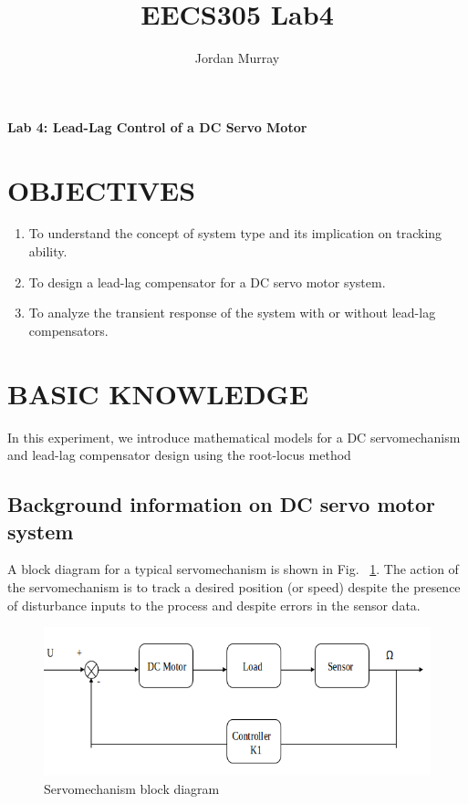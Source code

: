 \documentclass[11pt,a4paper]{article}
\author{Jordan Murray}
\title{EECS305 Lab4}
\begin{document}
\begin{center}
\fontsize{24}{12}\selectfont
\textbf{Lab 4: Lead-Lag Control of a DC Servo Motor}
\end{center}
\section{OBJECTIVES}
\begin{enumerate}
\item To understand the concept of system type and its implication on tracking ability.

\item To design a lead-lag compensator for a DC servo motor system.

\item To analyze the transient response of the system with or without lead-lag compensators.
\end{enumerate}

\section{BASIC KNOWLEDGE}
In this experiment, we introduce mathematical models for a DC servomechanism and lead-lag compensator design using the root-locus method

\subsection{Background information on DC servo motor system}

A block diagram for a typical servomechanism is shown in Fig. ~\ref{fig:servoblock}.  The action of the servomechanism is to track a desired position (or speed) despite the 
presence of disturbance inputs to the process and despite errors in the 
sensor data.

\begin{figure}[here]
\includegraphics[width=\textwidth]{imglab/servoblockdiagram.png}
\caption{Servomechanism block diagram}
\label{fig:servoblock}
\end{figure}
\end{document}
